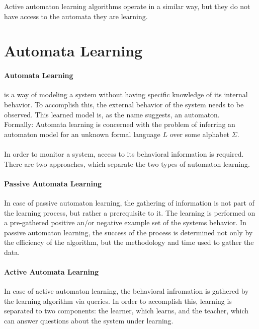 Active automaton learning algorithms operate in a similar way, but they do not have access to the automata they are learning.

\section{Automata Learning} \label{sec_backgrautomatalearning}



\paragraph{Automata Learning}  is a way of modeling a system without having specific knowledge of its internal behavior. To accomplish this, the external behavior of the system needs to be observed. This learned model is, as the name suggests, an automaton. 
\\Formally: Automata  learning is  concerned  with  the  problem  of  inferring  an automaton model for an unknown formal language $L$ over some alphabet $\Sigma$\cite{Howar2018}.
\\\\In order to monitor a system, access to its behavioral information is required. There are two approaches, which separate the two types of automaton learning.

\paragraph{Passive Automata Learning} In case of passive automaton learning, the gathering of information is not part of the learning process, but rather a prerequisite to it. The learning is performed on a pre-gathered positive an/or negative example set of the systems behavior. In passive automaton learning, the success of the process is determined not only by the efficiency of the algorithm, but the methodology and time used to gather the data.

\paragraph{Active Automata Learning} In case of active automaton learning, the behavioral infromation is gathered by the learning algorithm via queries. In order to accomplish this, learning is separated to two components: the learner, which learns, and the teacher, which can answer questions about the system under learning.



